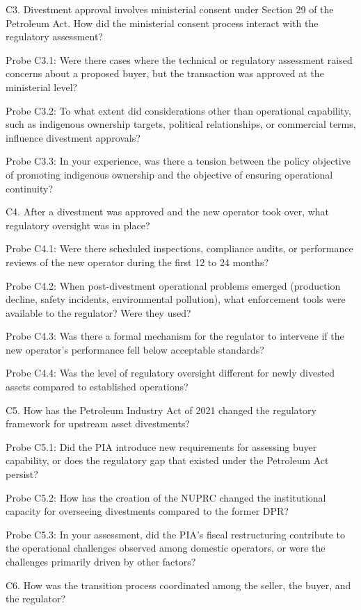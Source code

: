 \documentclass[twoside,fontset=lmodern]{mitthesis}
\begin{document}
C3. Divestment approval involves ministerial consent under Section 29 of
the Petroleum Act. How did the ministerial consent process interact with
the regulatory assessment?

Probe C3.1: Were there cases where the technical or regulatory
assessment raised concerns about a proposed buyer, but the transaction
was approved at the ministerial level?

Probe C3.2: To what extent did considerations other than operational
capability, such as indigenous ownership targets, political
relationships, or commercial terms, influence divestment approvals?

Probe C3.3: In your experience, was there a tension between the policy
objective of promoting indigenous ownership and the objective of
ensuring operational continuity?

C4. After a divestment was approved and the new operator took over, what
regulatory oversight was in place?

Probe C4.1: Were there scheduled inspections, compliance audits, or
performance reviews of the new operator during the first 12 to 24
months?

Probe C4.2: When post-divestment operational problems emerged
(production decline, safety incidents, environmental pollution), what
enforcement tools were available to the regulator? Were they used?

Probe C4.3: Was there a formal mechanism for the regulator to intervene
if the new operator's performance fell below acceptable standards?

Probe C4.4: Was the level of regulatory oversight different for newly
divested assets compared to established operations?

C5. How has the Petroleum Industry Act of 2021 changed the regulatory
framework for upstream asset divestments?

Probe C5.1: Did the PIA introduce new requirements for assessing buyer
capability, or does the regulatory gap that existed under the Petroleum
Act persist?

Probe C5.2: How has the creation of the NUPRC changed the institutional
capacity for overseeing divestments compared to the former DPR?

Probe C5.3: In your assessment, did the PIA's fiscal restructuring
contribute to the operational challenges observed among domestic
operators, or were the challenges primarily driven by other factors?

C6. How was the transition process coordinated among the seller, the
buyer, and the regulator?
\end{document}
